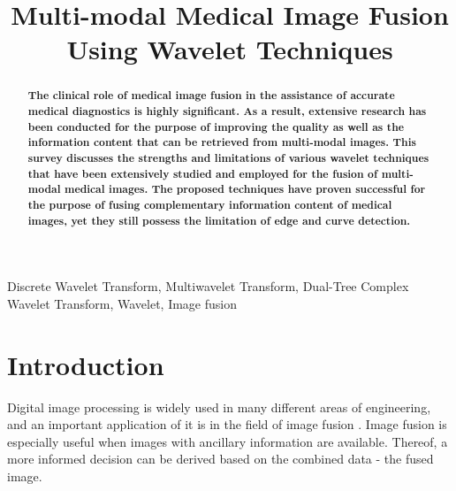 \documentclass{article}
\title{Multi-modal Medical Image Fusion Using Wavelet Techniques}
\begin{document}
%
\maketitle

\begin{abstract}
\ninept
\textbf{The clinical role of medical image fusion in the assistance of accurate medical diagnostics is highly significant. As a result, extensive research has been conducted for the purpose of improving the quality as well as the information content that can be retrieved from multi-modal images. This survey discusses the strengths and limitations of various wavelet techniques that have been extensively studied and employed for the fusion of multi-modal medical images. The proposed techniques have proven successful for the purpose of fusing complementary information content of medical images, yet they still possess the limitation of edge and curve detection.} 
\end{abstract}
%
\begin{keywords}
\ninept
Discrete Wavelet Transform, Multiwavelet Transform, Dual-Tree Complex Wavelet Transform, Wavelet, Image fusion
\end{keywords}
%
\section{Introduction}
\label{sec:intro}
Digital image processing is widely used in many different areas of engineering, and an important application of it is in the field of image fusion \cite{Deshmukh.2015,Kaur.2015}. 
Image fusion is especially useful when images with ancillary information are available. Thereof, a more informed decision can be derived based on the combined data - the fused image. 
\end{document}
